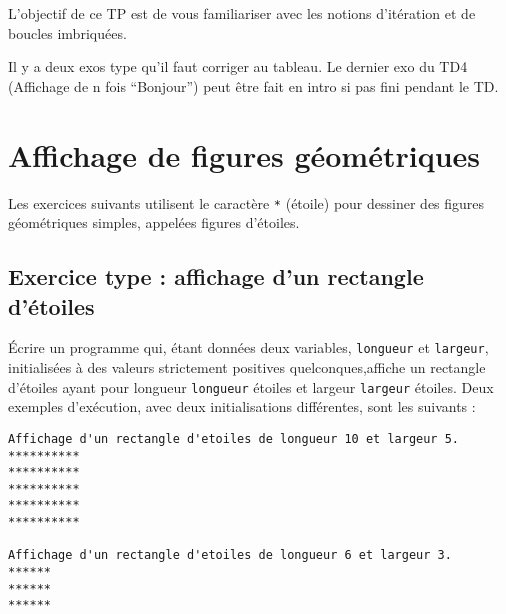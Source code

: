 



\vspace{-1em}L'objectif de ce TP est de vous familiariser avec les notions d'itération et de boucles imbriquées.

\begin{correction}
  Il y a deux exos type qu'il faut corriger au tableau.
  Le dernier exo du TD4 (Affichage de n fois ``Bonjour'') peut être fait en intro si pas fini pendant le TD.
\end{correction}

\newcommand{\TPshortName}{TP4}


\section{Affichage de figures géométriques}

Les exercices suivants utilisent le caractère \verb|*| (étoile) pour dessiner des figures géométriques simples, appelées figures d'étoiles.

\subsection{Exercice type : affichage d'un rectangle d'étoiles}

Écrire un programme qui, étant données deux variables,
\verb|longueur| et \verb|largeur|, initialisées à des valeurs
strictement positives quelconques,affiche  un rectangle d'étoiles ayant pour
longueur \verb|longueur| étoiles et largeur \verb|largeur|
étoiles. Deux exemples d'exécution, avec deux initialisations
différentes, sont les suivants :
\begin{verbatim}
Affichage d'un rectangle d'etoiles de longueur 10 et largeur 5.
**********
**********
**********
**********
**********

Affichage d'un rectangle d'etoiles de longueur 6 et largeur 3.
******
******
******
\end{verbatim}

